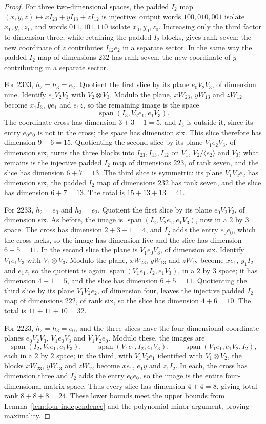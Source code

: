 \documentclass[11pt]{article}
\theoremstyle{remark}\newtheorem{remark}[theorem]{Remark}
\DeclareMathOperator{\Span}{span}
\begin{document}
\begin{proof}
For three two-dimensional spaces, the padded $I_2$ map
$(x,y,z)\mapsto xI_{23}+yI_{13}+zI_{12}$ is injective: output words
$100,010,001$ isolate $x_1,y_1,z_1$, and words $011,101,110$ isolate
$x_0,y_0,z_0$. Increasing only the third factor to dimension three,
while retaining the padded $I_2$ blocks, gives rank seven: the new
coordinate of $z$ contributes $I_{12}e_2$ in a separate sector. In
the same way the padded $I_2$ map of dimensions $232$ has rank seven,
the new coordinate of $y$ contributing in a separate sector.

For $2333$, $h_2=h_3=e_2$. Quotient the first slice by its plane
$e_0V_2V_3$, of dimension nine. Identify $e_1V_2V_3$ with
$V_2\otimes V_3$. Modulo the plane, $xW_{23}$, $yW_{13}$ and $zW_{12}$
become $x_1I_3$, $ye_1$ and $e_1z$, so the remaining image is the space
\[\Span(I_3,V_2e_1,e_1V_3).\]
The coordinate cross
has dimension $3+3-1=5$, and $I_3$ is outside it, since its entry
$e_0e_0$ is not in the cross; the space has dimension six. This slice
therefore has dimension $9+6=15$. Quotienting the second slice by its
plane $V_1e_2V_3$, of dimension six, turns the three blocks into
$I_{23},I_{13},I_{12}$ on $V_1$, $V_2/\langle e_2\rangle$ and $V_3$; what
remains is the injective padded $I_2$ map of dimensions $223$, of
rank seven, and the slice has dimension $6+7=13$. The third slice is
symmetric: its plane $V_1V_2e_2$ has dimension six, the padded $I_2$
map of dimensions $232$ has rank seven, and the slice has dimension
$6+7=13$. The total is $15+13+13=41$.

For $2233$, $h_2=e_0$ and $h_3=e_2$. Quotient the first slice by its
plane $e_0V_2V_3$, of dimension six. As before, the image is
$\Span(I_2,V_2e_1,e_1V_3)$, now in a $2$ by $3$ space. The cross has
dimension $2+3-1=4$, and $I_2$ adds the entry $e_0e_0$, which the cross
lacks, so the image has dimension five and the slice has dimension
$6+5=11$. In the second slice the plane is
$V_1e_0V_3$, of dimension six. Identify $V_1e_1V_3$ with
$V_1\otimes V_3$. Modulo the plane, $xW_{23}$, $yW_{13}$ and $zW_{12}$
become $xe_1$, $y_1I_2$ and $e_1z$, so the quotient is again
$\Span(V_1e_1,I_2,e_1V_3)$, in a $2$ by $3$ space; it has dimension
$4+1=5$, and the slice has dimension $6+5=11$.
Quotienting the third slice by its plane $V_1V_2e_2$, of dimension
four, leaves the injective padded $I_2$ map of dimensions $222$, of
rank six, so the slice has dimension $4+6=10$. The total is
$11+11+10=32$.

For $2223$, $h_2=h_3=e_0$, and the three slices have the
four-dimensional coordinate planes $e_0V_2V_3$, $V_1e_0V_3$ and
$V_1V_2e_0$. Modulo these, the images are
\[
 \Span(I_2,V_2e_1,e_1V_3),\qquad
 \Span(V_1e_1,I_2,e_1V_3),\qquad
 \Span(V_1e_1,e_1V_2,I_2),
\]
each in a $2$ by $2$ space; in the third, with $V_1V_2e_1$ identified
with $V_1\otimes V_2$, the blocks $xW_{23}$, $yW_{13}$ and $zW_{12}$
become $xe_1$, $e_1y$ and $z_1I_2$. In each, the
cross has dimension three and $I_2$ adds the entry $e_0e_0$, so the
image is the entire four-dimensional matrix space. Thus every slice
has dimension $4+4=8$, giving total rank $8+8+8=24$. These lower bounds
meet the upper bounds
from Lemma~\ref{lem:four-independence} and the polynomial-minor
argument, proving maximality.
\end{proof}
\end{document}

